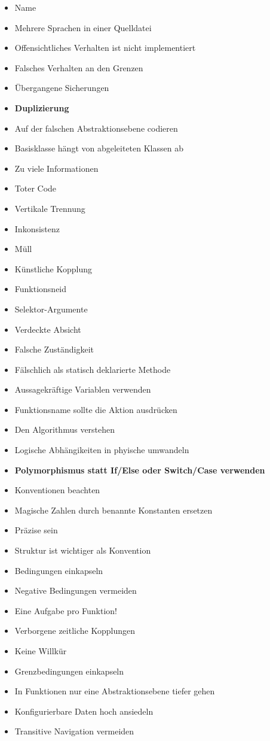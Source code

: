 \begin{itemize}
			\item Name
			\item Mehrere Sprachen in einer Quelldatei 
			\item Offensichtliches Verhalten ist nicht implementiert 
			\item Falsches Verhalten an den Grenzen 
			\item Übergangene Sicherungen 
			\item \textbf{Duplizierung} 
			\item Auf der falschen Abstraktionsebene codieren 
			\item Basisklasse hängt von abgeleiteten Klassen ab
			\item Zu viele Informationen 
			\item Toter Code 
			\item Vertikale Trennung 
			\item Inkonsistenz 
			\item Müll 
			\item Künstliche Kopplung 
			\item Funktionsneid 
			\item Selektor-Argumente 
			\item Verdeckte Absicht 
			\item Falsche Zuständigkeit 
			\item Fälschlich als statisch deklarierte Methode 
			\item Aussagekräftige Variablen verwenden 
			\item Funktionsname sollte die Aktion ausdrücken 
			\item Den Algorithmus verstehen 
			\item Logische Abhängikeiten in phyische umwandeln 
			\item \textbf{Polymorphismus statt If/Else oder Switch/Case verwenden }
			\item Konventionen beachten 
			\item Magische Zahlen durch benannte Konstanten ersetzen 
			\item Präzise sein 
			\item Struktur ist wichtiger als Konvention 
			\item Bedingungen einkapseln 
			\item Negative Bedingungen vermeiden 
			\item Eine Aufgabe pro Funktion!
			\item Verborgene zeitliche Kopplungen 
			\item Keine Willkür 
			\item Grenzbedingungen einkapseln 
			\item In Funktionen nur eine Abstraktionsebene tiefer gehen 
			\item Konfigurierbare Daten hoch ansiedeln 
			\item Transitive Navigation vermeiden
\end{itemize}

